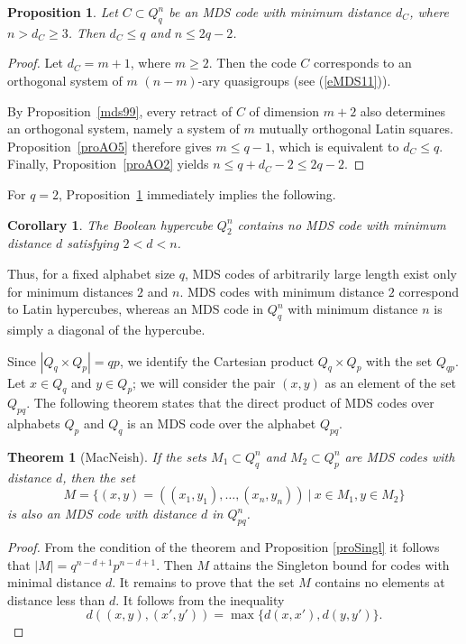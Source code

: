 \documentclass[11pt]{article}
\newtheorem{theorem}{Theorem}[section]
\newtheorem{claim}{Proposition}[section]
\newtheorem{corollary}{Corollary}[section]
\theoremstyle{definition}
\begin{document}
{{{\begin{claim}\label{proAO9}
Let $C\subset Q_q^n$ be an {\rm MDS} code with minimum distance
$d_C$, where $n>d_C\ge3$. Then
$d_C\le q$ and $n\le2q-2$.
\end{claim}

\begin{proof}
Let $d_C=m+1$, where $m\ge2$. Then the code $C$ corresponds to an
orthogonal system of $m$ $(n-m)$-ary quasigroups (see (\ref{eMDS11})).

By Proposition~\ref{mds99}, every retract of $C$ of dimension $m+2$
also determines an orthogonal system, namely a system of $m$
mutually orthogonal Latin squares. Proposition~\ref{proAO5}
therefore gives
$m\le q-1$,
which is equivalent to $d_C\le q$.
Finally, Proposition~\ref{proAO2} yields
$n\le q+d_C-2\le2q-2$.
\end{proof}

For $q=2$, Proposition~\ref{proAO9} immediately implies the following.

\begin{corollary}\label{proAO7}
The Boolean hypercube $Q_2^n$ contains no {\rm MDS} code with minimum
distance $d$ satisfying
$2<d<n$.
\end{corollary}

Thus, for a fixed alphabet size $q$, MDS codes of arbitrarily large
length exist only for minimum distances $2$ and $n$. MDS codes with
minimum distance $2$ correspond to Latin hypercubes, whereas an MDS
code in $Q_q^n$ with minimum distance $n$ is simply a diagonal of the
hypercube.

Since $|Q_q\times Q_p|=qp$, we identify the Cartesian product $Q_q\times Q_p$ with the set $Q_{qp}$.
Let   $x\in Q_q$ and $y\in Q_p$; we will consider 
the pair $(x,y)$  as an element of the set $Q_{pq}$.
The following theorem states that the direct product of MDS codes over
alphabets $Q_p$ and $Q_q$ is an MDS code over the alphabet $Q_{pq}$.

\begin{theorem}[MacNeish]\label{thMN}
If the sets $M_1\subset Q_q^n$ and $M_2\subset Q_p^n$ are {\rm
MDS} codes with distance $d$, then the set
$$M=\{(x,y)=((x_1,y_1),\dots,(x_n,y_n)) \ |\ x\in M_1, y\in M_2\}$$ is also an
 {\rm MDS} code with distance $d$ in $Q^n_{pq}$.
\end{theorem}
\begin{proof}
From the condition of the theorem and Proposition \ref{proSingl} it follows that
$|M|=q^{n-d+1}p^{n-d+1}$. Then $M$ attains the Singleton bound for codes with minimal distance $d$. It remains to prove that the set $M$ contains no
elements at distance less than $d$. It follows from the inequality
$$d((x,y),(x',y'))=\max\{d(x,x'),d(y,y')\}.$$
\end{proof}

}}}
\end{document}
